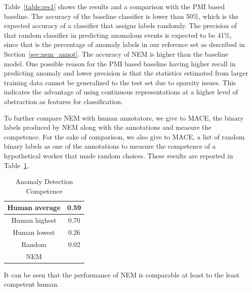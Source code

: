 Table~\ref{table:res1} shows the results and a comparison with the PMI based baseline.  The accuracy of the 
baseline classifier is lower than 50\%, which is the expected accuracy of a classifier that assigns labels randomly.  
The precision of that random classifier in predicting anomalous events is expected to be 41\%, since 
that is the percentage of anomaly labels in our reference set as described in
Section~\ref{sec:nem_annot}.  The accuracy of NEM is higher than the baseline model.
One possible reason for the PMI based baseline having higher recall in 
predicting anomaly and lower precision is that the statistics estimated from larger training data cannot
be generalized to the test set due to sparsity issues.  This indicates the advantage of using continuous
representations at a higher level of abstraction as features for classification.

To further compare NEM with human annotators, we give to MACE, the binary labels produced
by NEM along with the annotations and
measure the competence.  For the sake of comparison, we also give to MACE, a list of
random binary labels as one of the annotations 
to measure the competence of a hypothetical worker that made random choices. 
These results are reported in Table~\ref{table:res2}.
\begin{table}
\begin{center}
  \begin{tabular}[c]{|c|c|}
 \hline
  Human average & 0.59 \\
  \hline
  Human highest  & 0.70 \\
  \hline
  Human lowest & 0.26 \\
  \hline
  Random & 0.02 \\
  \hline
  NEM &  \\
  \hline
  \end{tabular}
\end{center}
 \caption{Anomaly Detection Competence}
 \label{table:res2}
\end{table}
It can be seen that the performance of NEM is comparable at least to the least
competent human.
